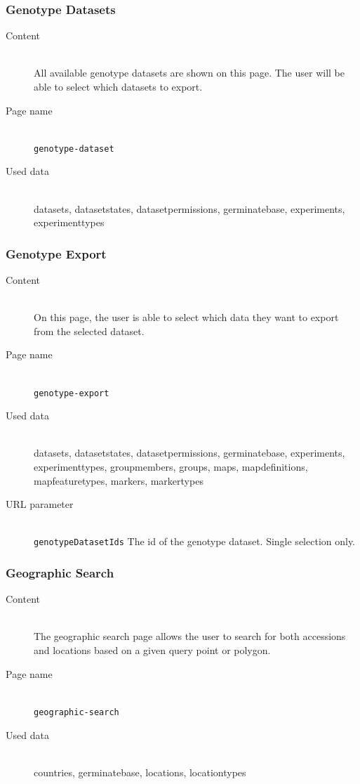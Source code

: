 \subsubsection{Genotype Datasets}
\begin{description}
	\item[Content]\hfill\\All available genotype datasets are shown on this page. The user will be able to select which datasets to export.
	\item[Page name]\hfill\\\texttt{genotype-dataset}
	\item[Used data]\hfill\\datasets, datasetstates, datasetpermissions, germinatebase, experiments, experimenttypes
\end{description}

\subsubsection{Genotype Export}
\begin{description}
	\item[Content]\hfill\\On this page, the user is able to select which data they want to export from the selected dataset.
	\item[Page name]\hfill\\\texttt{genotype-export}
	\item[Used data]\hfill\\datasets, datasetstates, datasetpermissions, germinatebase, experiments, experimenttypes, groupmembers, groups, maps, mapdefinitions, mapfeaturetypes, markers, markertypes
	\item[URL parameter]\hfill\\\texttt{genotypeDatasetIds} The id of the genotype dataset. Single selection only.
\end{description}

\subsubsection{Geographic Search}
\begin{description}
	\item[Content]\hfill\\The geographic search page allows the user to search for both accessions and locations based on a given query point or polygon.
	\item[Page name]\hfill\\\texttt{geographic-search}
	\item[Used data]\hfill\\countries, germinatebase, locations, locationtypes
\end{description}

